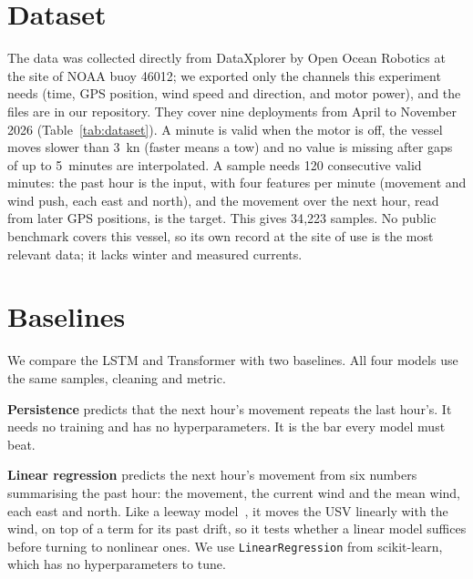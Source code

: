 \documentclass[sigconf]{acmart}
\begin{document}
\section{Dataset}
The data was collected directly from DataXplorer by Open Ocean Robotics at the site of NOAA buoy 46012; we exported only the channels this experiment needs (time, GPS position, wind speed and direction, and motor power), and the files are in our repository. They cover nine deployments from April to November 2026 (Table~\ref{tab:dataset}). A minute is valid when the motor is off, the vessel moves slower than 3~kn (faster means a tow) and no value is missing after gaps of up to 5~minutes are interpolated. A sample needs 120 consecutive valid minutes: the past hour is the input, with four features per minute (movement and wind push, each east and north), and the movement over the next hour, read from later GPS positions, is the target. This gives 34{,}223 samples. No public benchmark covers this vessel, so its own record at the site of use is the most relevant data; it lacks winter and measured currents.



\section{Baselines}

We compare the LSTM and Transformer with two baselines. All four models use the same samples, cleaning and metric.

\textbf{Persistence} predicts that the next hour's movement repeats the last hour's. It needs no training and has no hyperparameters. It is the bar every model must beat.

\textbf{Linear regression} predicts the next hour's movement from six numbers summarising the past hour: the movement, the current wind and the mean wind, each east and north. Like a leeway model~\cite{breivik2011leeway}, it moves the USV linearly with the wind, on top of a term for its past drift, so it tests whether a linear model suffices before turning to nonlinear ones. We use \texttt{LinearRegression} from scikit-learn, which has no hyperparameters to tune.
\end{document}
